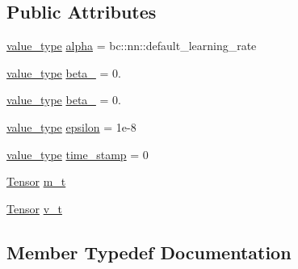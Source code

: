 \subsection*{Public Attributes}
\begin{DoxyCompactItemize}
\item 
\hyperlink{structbc_1_1nn_1_1Adam_1_1Optimizer_a6c0f45fad49cbec9368339576806cb75}{value\+\_\+type} \hyperlink{structbc_1_1nn_1_1Adam_1_1Optimizer_a243fdeaa31efe0e3dfeec06fa2085c9c}{alpha} = bc\+::nn\+::default\+\_\+learning\+\_\+rate
\item 
\hyperlink{structbc_1_1nn_1_1Adam_1_1Optimizer_a6c0f45fad49cbec9368339576806cb75}{value\+\_\+type} \hyperlink{structbc_1_1nn_1_1Adam_1_1Optimizer_ac4b651475f627b4db5a0976acb2ee065}{beta\+\_} = 0.
\item 
\hyperlink{structbc_1_1nn_1_1Adam_1_1Optimizer_a6c0f45fad49cbec9368339576806cb75}{value\+\_\+type} \hyperlink{structbc_1_1nn_1_1Adam_1_1Optimizer_ace782b7ce94bce70e21bb0d0fa4f8dbd}{beta\+\_} = 0.
\item 
\hyperlink{structbc_1_1nn_1_1Adam_1_1Optimizer_a6c0f45fad49cbec9368339576806cb75}{value\+\_\+type} \hyperlink{structbc_1_1nn_1_1Adam_1_1Optimizer_a33306eaa695d49731f9065593b5aa7da}{epsilon} = 1e-\/8
\item 
\hyperlink{structbc_1_1nn_1_1Adam_1_1Optimizer_a6c0f45fad49cbec9368339576806cb75}{value\+\_\+type} \hyperlink{structbc_1_1nn_1_1Adam_1_1Optimizer_a8cc7829ee8d768436af25b832b58a80b}{time\+\_\+stamp} = 0
\item 
\hyperlink{namespacebc_a659391e47ab612be3ba6c18cf9c89159}{Tensor} \hyperlink{structbc_1_1nn_1_1Adam_1_1Optimizer_aa715d15f98e2b2828e74abab64f3e047}{m\+\_\+t}
\item 
\hyperlink{namespacebc_a659391e47ab612be3ba6c18cf9c89159}{Tensor} \hyperlink{structbc_1_1nn_1_1Adam_1_1Optimizer_aef1485ae35e3bff1f0bc4e26e84b829c}{v\+\_\+t}
\end{DoxyCompactItemize}


\subsection{Member Typedef Documentation}
\mbox{\label{structbc_1_1nn_1_1Adam_1_1Optimizer_aaa59035413615a398b1a0b8738078a54}} 

